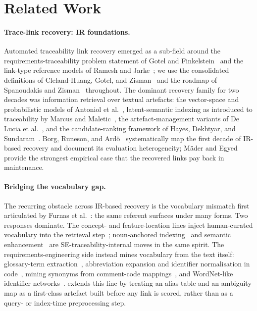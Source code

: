 \section{Related Work}\label{sec:rw}


\paragraph{Trace-link recovery: IR foundations.}
Automated traceability link recovery emerged as a sub-field around the requirements-traceability problem statement of Gotel and Finkelstein~\cite{gotel1994analysis} and the link-type reference models of Ramesh and Jarke~\cite{ramesh2001toward}; we use the consolidated definitions of Cleland-Huang, Gotel, and Zisman~\cite{clelandhuang2012handbook} and the roadmap of Spanoudakis and Zisman~\cite{spanoudakis2005software} throughout.
The dominant recovery family for two decades was information retrieval over textual artefacts: the vector-space and probabilistic models of Antoniol et al.~\cite{antoniol2002recovering}, latent-semantic indexing as introduced to traceability by Marcus and Maletic~\cite{marcus2003recovering}, the artefact-management variants of De Lucia et al.~\cite{delucia2007recovering,delucia2009assessing}, and the candidate-ranking framework of Hayes, Dekhtyar, and Sundaram~\cite{hayes2006advancing}.
Borg, Runeson, and Ard{\"o}~\cite{borg2014recovering} systematically map the first decade of IR-based recovery and document its evaluation heterogeneity; M{\"a}der and Egyed~\cite{maeder2015developers} provide the strongest empirical case that the recovered links pay back in maintenance.

\paragraph{Bridging the vocabulary gap.}
The recurring obstacle across IR-based recovery is the vocabulary mismatch first articulated by Furnas et al.~\cite{furnas1987vocabulary}: the same referent surfaces under many forms.
Two responses dominate.
The concept- and feature-location lines inject human-curated vocabulary into the retrieval step~\cite{rajlich2002role,dit2013feature}; noun-anchored indexing~\cite{capobianco2013role} and semantic enhancement~\cite{mahmoud2015role} are SE-traceability-internal moves in the same spirit.
The requirements-engineering side instead mines vocabulary from the text itself: glossary-term extraction~\cite{arora2017automated,gemkow2018automatic}, abbreviation expansion and identifier normalisation in code~\cite{lawrie2011expanding}, mining synonyms from comment-code mappings~\cite{howard2013automatically}, and WordNet-like identifier networks~\cite{falleri2010automatic}.
\approach extends this line by treating an alias table and an ambiguity map as a first-class artefact built before any link is scored, rather than as a query- or index-time preprocessing step.

